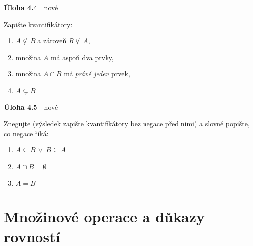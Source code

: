 \documentclass[11pt,a4paper]{article}
\newenvironment{pol}{\begin{enumerate}[label=(\alph*),leftmargin=2em,itemsep=3pt]}{\end{enumerate}}
\newenvironment{uloha}[2]{\Needspace{6\baselineskip}\par\vspace{6pt}\noindent\textbf{Úloha #1}\ \ {\footnotesize\color{gray}#2}\par\vspace{2pt}}{\par\vspace{4pt}}
\begin{document}
\begin{uloha}{4.4}{nové}
Zapište kvantifikátory:
\begin{pol}
  \item $A\nsubseteq B$ a zároveň $B\nsubseteq A$,
  \item množina $A$ má aspoň dva prvky,
  \item množina $A\cap B$ má \emph{právě jeden} prvek,
  \item $A\subsetneq B$.
\end{pol}


\end{uloha}

\begin{uloha}{4.5}{nové}
Znegujte (výsledek zapište kvantifikátory bez negace před nimi) a slovně popište, co negace říká:
\begin{pol}
  \item $A\subseteq B\ \lor\ B\subseteq A$
  \item $A\cap B=\emptyset$
  \item $A=B$
\end{pol}

\end{uloha}

\section{Množinové operace a důkazy rovností}
\end{document}
